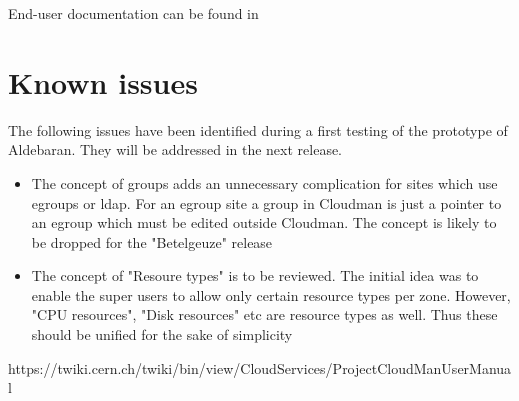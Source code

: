 \documentclass[12pt]{article}
\begin{document}
End-user documentation can be found in~\cite{ref:UserManual}

\section{Known issues}
The following issues have been identified during a first testing of the prototype of Aldebaran. They will be addressed in the next release.
\begin{itemize}
\item  The concept of groups adds an unnecessary complication for sites which use egroups or ldap. 
  For an egroup site a group in Cloudman is just a pointer to an egroup which must be edited outside Cloudman. The concept is likely to be dropped for the "Betelgeuze" release
\item  The concept of "Resoure types" is to be reviewed. The initial idea was to enable the super users to allow only certain resource types per zone.
  However, "CPU resources", "Disk resources" etc are resource types as well. Thus these should be unified for the sake of simplicity
\end{itemize}

\begin{thebibliography}{99}
 https://twiki.cern.ch/twiki/bin/view/CloudServices/ProjectCloudManUserManual
\end{thebibliography}
\end{document}
